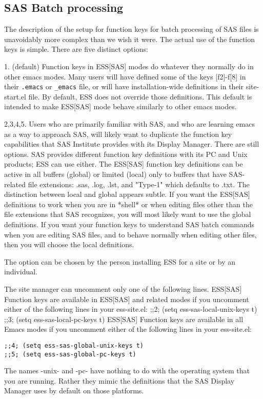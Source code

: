 \documentclass{article}
\begin{document}
\subsection{SAS Batch processing}
\label{sec:SAS:batch}

The description of the setup for function keys for batch processing of
SAS files is unavoidably more complex than we wish it were.  The actual
use of the function keys is simple.  There are five distinct options:

1. (default) Function keys in ESS[SAS] modes do whatever they normally
do in other emacs modes.  Many users will have defined some of the
keys [f2]-f[8] in their \verb+.emacs+ or \verb|_emacs| file, or will
have installation-wide definitions in their site-start.el file.  By
default, ESS does not override those definitions.  This default is
intended to make ESS[SAS] mode behave similarly to other emacs modes.

2,3,4,5.
Users who are primarily familiar with SAS, and who are learning emacs
as a way to approach SAS, will likely want to duplicate the function
key capabilities that SAS Institute provides with its Display Manager.
There are still options.  SAS provides different function key
definitions with its PC and Unix products; ESS can use either.  The
ESS[SAS] function key definitions can be active in all buffers
(global) or limited (local) only to buffers that have SAS-related file
extensions: .sas, .log, .lst, and "Type-1" which defaults to .txt.
The distinction between local and global appears subtle.  If you want
the ESS[SAS] definitions to work when you are in *shell* or when
editing files other than the file extensions that SAS recognizes, you
will most likely want to use the global definitions.
If you want your function keys to understand SAS batch commands when you
are editing SAS files, and to behave normally when editing other files,
then you will choose the local definitions.

The option can be chosen by the person installing ESS for a site or by
an individual.

The site manager can uncomment only one of the following lines.
ESS[SAS] Function keys are available in ESS[SAS] and related modes if you
uncomment either of the following lines in your ess-site.el:
;;2; (setq ess-sas-local-unix-keys t)
;;3; (setq ess-sas-local-pc-keys t)
ESS[SAS] Function keys are available in all Emacs modes if you
uncomment either of the following lines in your ess-site.el:
\begin{verbatim}
;;4; (setq ess-sas-global-unix-keys t)
;;5; (setq ess-sas-global-pc-keys t)
\end{verbatim}
The names -unix- and -pc- have nothing to do with the operating system
that you are running.  Rather they mimic the definitions that the SAS
Display Manager uses by default on those platforms.
\end{document}
